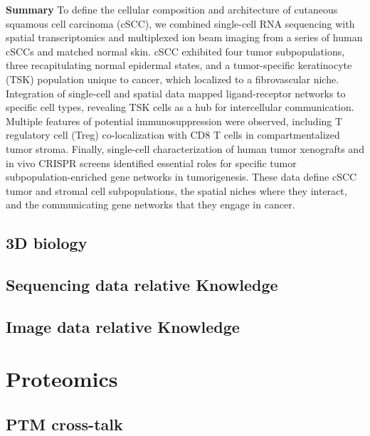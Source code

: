 \documentclass[
]{book}
\begin{document}
\textbf{Summary}
To define the cellular composition and architecture of cutaneous squamous cell carcinoma (cSCC), we combined single-cell RNA sequencing with spatial transcriptomics and multiplexed ion beam imaging from a series of human cSCCs and matched normal skin. cSCC exhibited four tumor subpopulations, three recapitulating normal epidermal states, and a tumor-specific keratinocyte (TSK) population unique to cancer, which localized to a fibrovascular niche. Integration of single-cell and spatial data mapped ligand-receptor networks to specific cell types, revealing TSK cells as a hub for intercellular communication. Multiple features of potential immunosuppression were observed, including T regulatory cell (Treg) co-localization with CD8 T cells in compartmentalized tumor stroma. Finally, single-cell characterization of human tumor xenografts and in vivo CRISPR screens identified essential roles for specific tumor subpopulation-enriched gene networks in tumorigenesis. These data define cSCC tumor and stromal cell subpopulations, the spatial niches where they interact, and the communicating gene networks that they engage in cancer\citep{ji2020multimodal}.

\hypertarget{d-biology}{%
\section{3D biology}\label{d-biology}}

\hypertarget{sequencing-data-relative-knowledge}{%
\section{Sequencing data relative Knowledge}\label{sequencing-data-relative-knowledge}}

\hypertarget{image-data-relative-knowledge}{%
\section{Image data relative Knowledge}\label{image-data-relative-knowledge}}

\hypertarget{proteomics}{%
\chapter{Proteomics}\label{proteomics}}

\hypertarget{ptm-cross-talk}{%
\section{PTM cross-talk}\label{ptm-cross-talk}}
\end{document}
